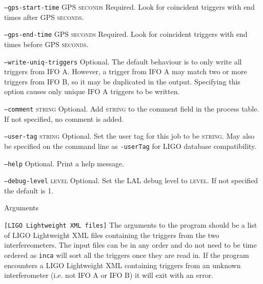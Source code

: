 \begin{entry}
\begin{entry}
\item[\texttt{--gps-start-time} \textsc{GPS seconds}] Required.  Look for
coincident triggers with end times after \textsc{GPS seconds}.

\item[\texttt{--gps-end-time} \textsc{GPS seconds}] Required.  Look for
coincident triggers with end times before \textsc{GPS seconds}.


\item[\texttt{--write-uniq-triggers}] Optional.  The default behaviour is to
only write all triggers from IFO A. However, a trigger from IFO A
may match two or more triggers from IFO B, so it may be duplicated in the 
output. Specifying this option causes only unique IFO A triggers to be
written.

\item[\texttt{--comment} \textsc{string}] Optional. Add \textsc{string} to the
comment field in the process table. If not specified, no comment is added. 

\item[\texttt{--user-tag} \textsc{string}] Optional. Set the user tag for this
job to be \textsc{string}. May also be specified on the command line as 
\texttt{-userTag} for LIGO database compatibility.

\item[\texttt{--help}] Optional.  Print a help message.
\end{entry}

\item[\texttt{--debug-level} \textsc{level}] Optional. Set the LAL debug
level to \textsc{level}. If not specified the default is 1.

\item[Arguments]\leavevmode
\begin{entry}
\item[\texttt{[LIGO Lightweight XML files]}] The arguments to the program
should be a list of LIGO Lightweight XML files containing the triggers from
the two interfereometers. The input files can be in any order and do not need
to be time ordered as \texttt{inca} will sort all the triggers once they are
read in. If the program encounters a LIGO Lightweight XML containing triggers
from an unknown interferometer (i.e. not IFO A or IFO B) it will exit with an
error.
\end{entry}


\end{entry}

